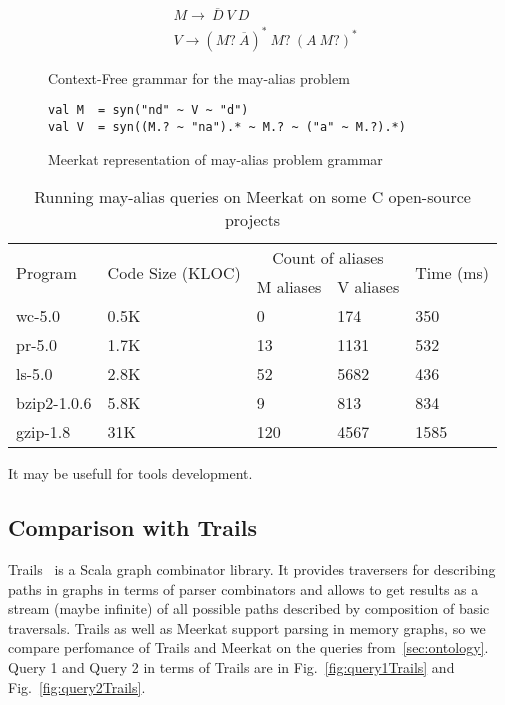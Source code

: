 \begin{figure}[t]
\begin{align*}
& M \rightarrow\ \overline{D}\ V\ D\\
& V \rightarrow (M ?\ \overline{A})^{*} \ M?\ (A\ M?)^{*}
\end{align*}
\caption{Context-Free grammar for the may-alias problem}
\label{lst:aliasGrammar}
\end{figure}

\begin{figure}[h]
\begin{lstlisting}
val M  = syn("nd" ~ V ~ "d")
val V  = syn((M.? ~ "na").* ~ M.? ~ ("a" ~ M.?).*)
\end{lstlisting}
\caption{Meerkat representation of  may-alias problem grammar}
\label{fig:aliasMeerkat}
\end{figure}


\begin{table}[t]
\centering
\begin{tabular}{|l|l|ll|l|}
\hline
\multirow{2}{*}{Program} & \multirow{2}{*}{Code Size (KLOC)} & \multicolumn{2}{c|}{Count of aliases} & \multirow{2}{*}{Time (ms)} \\ \cline{3-4}
 &  & \multicolumn{1}{c|}{M aliases} & \multicolumn{1}{c|}{V aliases} &  \\ 
\hline
\hline
wc-5.0      & 0.5K & 0   & 174  & 350 \\
pr-5.0      & 1.7K & 13  & 1131 & 532 \\
ls-5.0      & 2.8K & 52  & 5682 & 436 \\
bzip2-1.0.6 & 5.8K & 9   & 813  & 834 \\
gzip-1.8    & 31K  & 120 & 4567 & 1585\\
\hline
\end{tabular}
\caption{Running may-alias queries on Meerkat on some C open-source projects}
\label{table:staticAnalysis}
\end{table}

It may be usefull for tools development.

\subsection{Comparison with Trails}

Trails~\cite{ScalaGraphParsing} is a Scala graph combinator library.
It provides traversers for describing paths in graphs in terms of parser combinators and allows to get results as a stream (maybe infinite) of all possible paths described by composition of basic traversals.
Trails as well as Meerkat support parsing in memory graphs, so we compare perfomance of Trails and Meerkat on the queries from~\autoref{sec:ontology}.
Query 1 and Query 2 in terms of Trails are in Fig.~\ref{fig:query1Trails} and Fig.~\ref{fig:query2Trails}.


